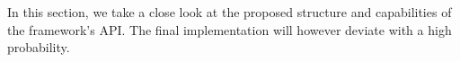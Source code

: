 In this section, we take a close look at the proposed structure and capabilities of the framework's API.
The final implementation will however deviate with a high probability.
